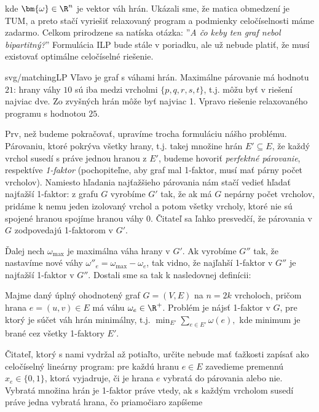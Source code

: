 \noindent
kde $\bm{\omega}\in\R^n$ je vektor váh hrán. Ukázali sme, že matica obmedzení je TUM, a preto stačí vyriešiť 
relaxovaný program a podmienky celočíselnosti máme zadarmo. Celkom prirodzene sa natíska otázka: 
''{\em A čo keby ten graf nebol bipartitný?}'' Formulácia ILP bude stále v poriadku, ale už nebude platiť, že
musí existovať optimálne celočíselné riešenie.


\begin{myfig}{0.8\textwidth}{svg/matchingLP}
  Vľavo je graf s váhami hrán. Maximálne párovanie má hodnotu $21$: hrany váhy $10$ sú iba medzi vrcholmi 
  $\{p,q,r,s,t\}$, t.j. môžu byť v riešení najviac dve. Zo zvyšných hrán môže byť najviac 1.
  Vpravo riešenie relaxovaného programu s hodnotou $25$.
\end{myfig}

\noindent
Prv, než budeme pokračovať, upravíme trocha formuláciu nášho problému. Párovaniu, ktoré pokrýva všetky hrany,
t.j. takej množine hrán $E'\subseteq E$, že každý vrchol susedí s práve jednou hranou z $E'$, 
budeme hovoriť {\em perfektné párovanie}, respektíve {\em 1-faktor} (pochopiteľne, aby graf mal 1-faktor,
musí mať párny počet vrcholov). Namiesto hľadania najťažšieho párovania
nám stačí vedieť hľadať najťažší 1-faktor: z grafu $G$ vyrobíme $G'$ tak, že ak má  $G$ nepárny počet 
vrcholov, pridáme k nemu jeden izolovaný vrchol a potom všetky vrcholy, ktoré nie sú spojené hranou spojíme
hranou váhy 0. Čitateľ sa ľahko presvedčí, že párovania v $G$ zodpovedajú 1-faktorom v $G'$.

\noindent
Ďalej nech $\omega_{\max}$ je maximálna váha hrany v $G'$. Ak vyrobíme $G''$ tak, že
nastavíme nové váhy $\omega''_e=\omega_{\max}-\omega_e$, tak vidno, že najľahší 1-faktor v $G''$ je 
najťažší 1-faktor v $G''$. Dostali sme sa tak k nasledovnej definícii:

\begin{framed}
  \begin{dfn}
    \label{dfn:minFactor}
    Majme daný úplný ohodnotený graf $G=(V,E)$ na $n=2k$ vrcholoch, pričom hrana
    $e=(u,v)\in E$ má váhu $\omega_e\in\R^+$.  Problém \minfactor je 
    nájsť 1-faktor v $G$, pre ktorý je súčet váh hrán
    minimálny, t.j.
    $\min_{E'}\sum_{e\in E'}\omega(e),$
    kde minimum je brané cez všetky 1-faktory $E'$.\end{dfn}\end{framed}


\noindent
Čitateľ, ktorý s nami vydržal až potiaľto, určite nebude mať ťažkosti zapísať \minfactor ako celočíselný
lineárny program:
pre každú hranu $e\in E$ zavedieme premennú $x_e\in\{0,1\}$, ktorá
vyjadruje, či je hrana $e$ vybratá do párovania alebo nie.
Vybratá množina hrán je 1-faktor práve vtedy, ak s každým vrcholom susedí práve jedna vybratá
hrana, čo priamočiaro zapíšeme

